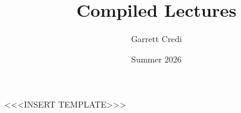 \documentclass[handout]{ltx-talk}
\title{Compiled Lectures}
\author{Garrett Credi}
\date{Summer 2026}
\begin{document}
<<<INSERT TEMPLATE>>>
\printindex
\end{document}
